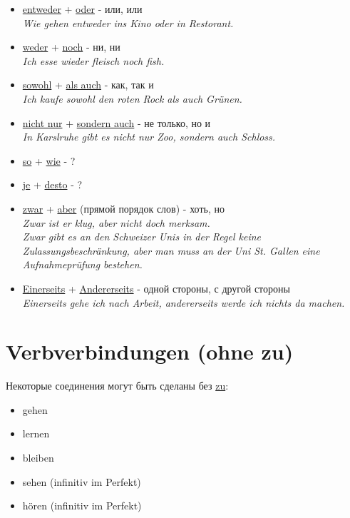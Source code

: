 \documentclass[12pt,a4paper]{report}
\newcommand{\satzew}[1]{\underline{#1}}
\newcommand{\ubersatze}[1]{\textit{#1}}
\begin{document}
\begin{itemize}
\item \satzew{entweder} + \satzew{oder} - или, или
~\\ \ubersatze{Wie gehen entweder ins Kino oder in Restorant.}
\item \satzew{weder} + \satzew{noch} - ни, ни
~\\ \ubersatze{Ich esse wieder fleisch noch fish.}
\item \satzew{sowohl} + \satzew{als auch} - как, так и
~\\ \ubersatze{Ich kaufe sowohl den roten Rock als auch Grünen.}
\item \satzew{nicht nur} + \satzew{sondern auch} - не только, но и
~\\ \ubersatze{In Karslruhe gibt es nicht nur Zoo, sondern auch Schloss.}
\item \satzew{so} + \satzew{wie} - ?
\item \satzew{je} + \satzew{desto} - ?
\item \satzew{zwar} + \satzew{aber} (прямой порядок слов) - хоть, но
~\\ \ubersatze{Zwar ist er klug, aber nicht doch merksam.}
~\\ \ubersatze{Zwar gibt es an den Schweizer Unis in der Regel keine Zulassungsbeschränkung, aber man muss an der Uni St. Gallen eine Aufnahmeprüfung bestehen.}
\item \satzew{Einerseits} + \satzew{Andererseits} -  одной стороны, с другой стороны
~\\ \ubersatze{Einerseits gehe ich nach Arbeit, andererseits werde ich nichts da machen.}
\end{itemize}

\chapter{Verbverbindungen (ohne zu)}

Некоторые соединения могут быть сделаны без \satzew{zu}:
\begin{itemize}
    \item gehen
    \item lernen
    \item bleiben
    \item sehen (infinitiv im Perfekt)
    \item hören (infinitiv im Perfekt)
\end{itemize}
\end{document}
